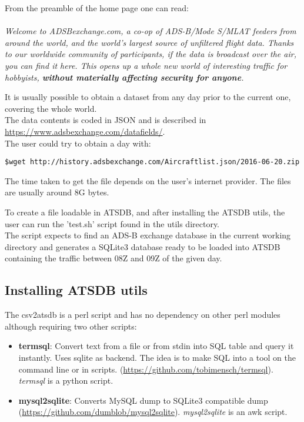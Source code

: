 From the preamble of the home page one can read: \\\\
\textit{Welcome to ADSBexchange.com, a co-op of ADS-B/Mode S/MLAT feeders from around the world, and the world's largest source of unfiltered flight data.  Thanks to our worldwide community of participants, if the data is broadcast over the air, you can find it here.  This opens up a whole new world of interesting traffic for hobbyists, \textbf{without materially affecting security for anyone}. \\}

It is usually possible to obtain a dataset from any day prior to the current one, covering the whole world. \\

The data contents is coded in JSON and is described in \url{https://www.adsbexchange.com/datafields/}. \\

The user could try to obtain a day with:
\begin{verbatim}
$wget http://history.adsbexchange.com/Aircraftlist.json/2016-06-20.zip
\end{verbatim}

The time taken to get the file depends on the user's internet provider. The files are usually around 8G bytes.

To create a file loadable in ATSDB, and after installing the ATSDB utils, the user can run the 'test.sh' script found in the utils directory. \\

The script expects to find an ADS-B exchange database in the current working directory and generates a SQLite3 database ready to be loaded into ATSDB containing the traffic between 08Z and 09Z of the given day.

\subsection{Installing ATSDB utils}

The csv2atsdb is a perl script and has no dependency on other perl modules although requiring two other scripts:
\begin{itemize}
\item \textbf{termsql}: Convert text from a file or from stdin into SQL table and query it instantly. Uses sqlite as backend. The idea is to make SQL into a tool on the command line or in scripts. (\url{https://github.com/tobimensch/termsql}). \textit{termsql} is a python script.
\item \textbf{mysql2sqlite}: Converts MySQL dump to SQLite3 compatible dump (\url{https://github.com/dumblob/mysql2sqlite}). \textit{mysql2sqlite} is an awk script.
\\
\end{itemize}

